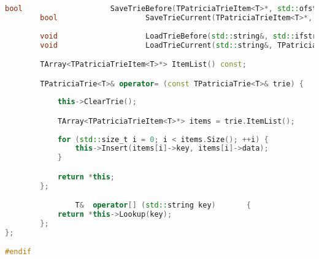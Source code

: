 \begin{lstlisting}[language=C++]
        bool                    SaveTrieBefore(TPatriciaTrieItem<T>*, std::ofstream*) const;
        bool                    SaveTrieCurrent(TPatriciaTrieItem<T>*, std::ofstream*) const;
        
        void                    LoadTrieBefore(std::string&, std::ifstream*);
        void                    LoadTrieCurrent(std::string&, TPatriciaTrieItem<T>*, std::ifstream*);

        TArray<TPatriciaTrieItem<T>*> ItemList() const;

        TPatriciaTrie<T>& operator= (const TPatriciaTrie<T>& trie) {
            
            this->ClearTrie();

            TArray<TPatriciaTrieItem<T>*> items = trie.ItemList();
            
            for (std::size_t i = 0; i < items.Size(); ++i) {
                this->Insert(items[i]->key, items[i]->data);
            }

            return *this;
        };

                T&  operator[] (std::string key)       {
            return *this->Lookup(key);
        };
};

#endif
\end{lstlisting}

